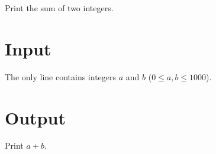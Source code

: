 
Print the sum of two integers.

\section*{Input}
The only line contains integers $a$ and $b$ ($0 \le a, b \le 1000$).

\section*{Output}
Print $a+b$.
